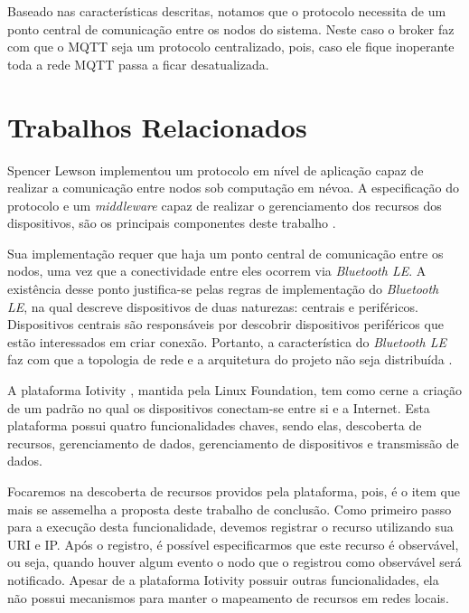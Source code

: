Baseado nas características descritas, notamos que o protocolo necessita de um ponto central de comunicação entre os nodos do sistema.
Neste caso o broker faz com que o MQTT seja um protocolo centralizado, pois, caso ele fique inoperante toda a rede MQTT passa a ficar desatualizada.

\section{Trabalhos Relacionados}

Spencer Lewson implementou um protocolo em nível de aplicação \cite{tanenbaum2011redes} capaz de realizar a comunicação entre nodos sob computação em névoa.
A especificação do protocolo e um \textit{middleware} capaz de realizar o gerenciamento dos recursos dos dispositivos, são os principais componentes deste trabalho \cite{Spencer:2015}.

Sua implementação requer que haja um ponto central de comunicação entre os nodos, uma vez que a conectividade entre eles ocorrem via \textit{Bluetooth LE}.
A existência desse ponto justifica-se pelas regras de implementação do \textit{Bluetooth LE}, na qual descreve dispositivos de duas naturezas: centrais e periféricos.
Dispositivos centrais são responsáveis por descobrir dispositivos periféricos que estão interessados em criar conexão.
Portanto, a característica do \textit{Bluetooth LE} faz com que a topologia de rede e a arquitetura do projeto não seja distribuída \cite{Spencer:2015}.

A plataforma Iotivity \cite{iotivity}, mantida pela Linux Foundation, tem como cerne a criação de um padrão no qual os dispositivos conectam-se entre si e a Internet.
Esta plataforma possui quatro funcionalidades chaves, sendo elas, descoberta de recursos, gerenciamento de dados, gerenciamento de dispositivos e transmissão de dados.

Focaremos na descoberta de recursos providos pela plataforma, pois, é o item que mais se assemelha a proposta deste trabalho de conclusão.
Como primeiro passo para a execução desta funcionalidade, devemos registrar o recurso utilizando sua URI e IP.
Após o registro, é possível especificarmos que este recurso é observável, ou seja, quando houver algum evento o nodo que o registrou como observável será notificado.
Apesar de a plataforma Iotivity possuir outras funcionalidades, ela não possui mecanismos para manter o mapeamento de recursos em redes locais.

